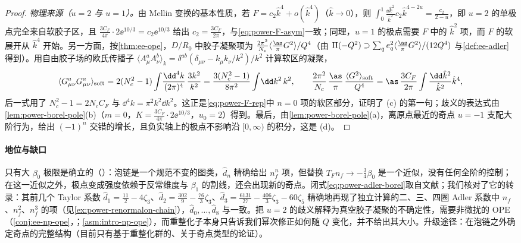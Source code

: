 \begin{proof}
\emph{物理来源（$u=2$ 与 $u=1$）。}由 Mellin 变换的基本性质，若 $F=c_2\hat k^4+o(\hat k^4)$（$\hat k\to0$），则 $\int_0^1\frac{\dd\hat k^2}{\hat k^2}c_2\hat k^{4-2u}=\frac{c_2}{2-u}$，即 $u=2$ 的单极点完全来自软胶子区，且 $\frac{3C_F}{4\pi}\cdot2\ee^{10/3}=c_2\ee^{10/3}$ 给出 $c_2=\frac{3C_F}{2\pi}$，与\eqref{eq:power-F-asym}一致；同理，$u=1$ 的极点需要 $F$ 中的 $\hat k^2$ 项，而 $F$ 的软展开从 $\hat k^4$ 开始。另一方面，按\cref{thm:ee-ope}，$D/R_0$ 中胶子凝聚项为 $\frac{2\pi^2}{N_c}\langle\frac{\as}{\pi}G^2\rangle/Q^4$（由 $\Pi(-Q^2)\supset\sum_qe_q^2\langle\frac{\as}{\pi}G^2\rangle/(12Q^4)$ 与\cref{def:ee-adler}得到）。用自由胶子场的欧氏传播子 $\langle A^a_\mu A^b_\nu\rangle_k=\delta^{ab}(\delta_{\mu\nu}-k_\mu k_\nu/k^2)/k^2$ 计算软区的凝聚，
\begin{equation}\label{eq:power-soft-condensate}
\langle G^a_{\mu\nu}G^a_{\mu\nu}\rangle_{\mathrm{soft}}=2(N_c^2-1)\int\!\frac{\dd^4k}{(2\pi)^4}\,\frac{3k^2}{k^2}=\frac{3(N_c^2-1)}{8\pi^2}\int\!\dd k^2\,k^2,
\qquad
\frac{2\pi^2}{N_c}\,\frac{\as}{\pi}\,\frac{\langle G^2\rangle_{\mathrm{soft}}}{Q^4}=\as\,\frac{3C_F}{2\pi}\int\frac{\dd\hat k^2}{\hat k^2}\hat k^4,
\end{equation}
后一式用了 $N_c^2-1=2N_cC_F$ 与 $\dd^4k=\pi^2k^2\dd k^2$。这正是\eqref{eq:power-F-rep}中 $n=0$ 项的软区部分，证明了 (c) 的第一句；歧义的表达式由\cref{lem:power-borel-pole}(b)（$m=0$，$K=\frac{3C_F}{4\pi}\cdot2\ee^{10/3}$，$u_0=2$）得到。最后，由\cref{lem:power-borel-pole}(a)，离原点最近的奇点 $u=-1$ 支配大阶行为，给出 $(-1)^n$ 交错的增长，且负实轴上的极点不影响沿 $[0,\infty)$ 的积分，这是 (d)。
\end{proof}

\paragraph{地位与缺口}
只有大 $\beta_0$ 极限是确立的（\tagP）：泡链是一个规范不变的图类，$\hat d_n$ 精确给出 $n_f^n$ 项，但替换 $T_Fn_f\to-\frac34\beta_0$ 是一个近似，没有任何全阶的控制；在这一近似之外，极点变成强度依赖于反常维度与 $\beta_1$ 的割线，还会出现新的奇点\cite[第~3~节]{Beneke1999}。闭式\eqref{eq:power-adler-borel}取自文献；我们核对了它的转录：其前几个 Taylor 系数 $\hat d_1=\frac{11}2-4\zeta_3$、$\hat d_2=\frac{302}9-\frac{76}3\zeta_3$、$\hat d_3=\frac{6131}{27}-\frac{406}{3}\zeta_3-60\zeta_5$ 精确地再现了独立计算的二、三、四圈 Adler 系数中 $n_f$、$n_f^2$、$n_f^3$ 的项（见\cref{ex:power-renormalon-chain}），$\hat d_0,\dots,\hat d_8$ 与\cite[表~4]{Beneke1999}一致。把 $u=2$ 的歧义解释为真空胶子凝聚的不确定性，需要非微扰的 OPE（\cref{conj:ee-np-ope}，\tagC；\cref{asm:intro-np-ope}），而重整化子本身只告诉我们幂次修正如何随 $Q$ 变化，并不给出其大小\cite[第~4.2.1~节]{Beneke1999}。升级途径：在泡链之外确定奇点的完整结构（目前只有基于重整化群的、关于奇点类型的论证）。

